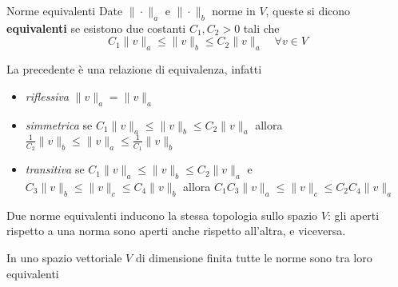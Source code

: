 \begin{definition}{Norme equivalenti}
    Date \(\|\cdot \|_a\) e \(\|\cdot \|_b\) norme in \(V\), queste si dicono
    \textbf{equivalenti} se esistono due costanti \(C_{1}, C_{2} >0\) tali che
    \[
        C_{1}\|v\|_a \le \|v\|_b \le C_{2}\|v\|_a \quad \forall v \in V
    \]
\end{definition}
\begin{remark}
    La precedente è una relazione di equivalenza, infatti
    \begin{itemize}
        \item \emph{riflessiva} \(\|v\|_a = \|v\|_a\)
        \item \emph{simmetrica} se \(C_{1}\|v\|_a \le \|v\|_b \le C_{2}\|v\|_a\)
            allora \(\frac{1}{C_{2}}\|v\|_b \le \|v\|_a \le \frac{1}{C_{1}}\|v\|_b\)
        \item \emph{transitiva} se \(C_{1}\|v\|_a \le \|v\|_b \le C_{2}\|v\|_a\)
            e \(C_{3}\|v\|_b \le \|v\|_c \le C_{4}\|v\|_b\) allora
            \(C_{1}C_{3}\|v\|_a \le \|v\|_c \le C_{2}C_{4}\|v\|_a\)
    \end{itemize}
\end{remark}
\begin{proposition}
    Due norme equivalenti inducono la stessa topologia sullo spazio \(V\): gli
    aperti rispetto a una norma sono aperti anche rispetto all'altra, e
    viceversa.
\end{proposition}
\begin{proposition}\label{prop:norme-equivalenti}
    In uno spazio vettoriale \(V\) di dimensione finita tutte le norme sono tra
    loro equivalenti
\end{proposition}
